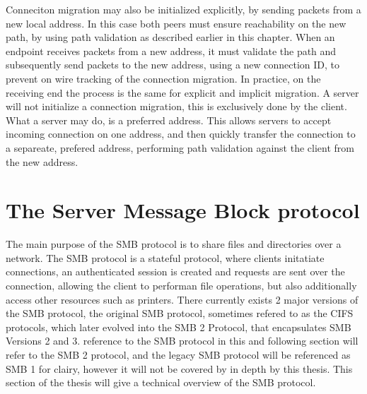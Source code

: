 \documentclass[english, 12pt, a4paper, elec, utf8, a-2b, online]{aaltothesis}
\begin{document}
Conneciton migration may also be initialized explicitly, by sending packets from
a new local address. In this case both peers must ensure reachability on the
new path, by using path validation as described earlier in this chapter. When an endpoint
receives packets from a new address, it must validate the path and subsequently
send packets to the new address, using a new connection ID, to prevent on wire
tracking of the connection migration. In practice, on the receiving end the process
is the same for explicit and implicit migration. A server will not initialize a 
connection migration, this is exclusively done by the client. What a server may
do, is a preferred address. This allows servers to accept incoming connection
on one address, and then quickly transfer the connection to a separeate, prefered
address, performing path validation against the client from the new address\cite{rfc9000}.

\clearpage

\section{The Server Message Block protocol}
\label{sec:smb}

The main purpose of the SMB protocol is to share files and directories over a network.
The SMB protocol is a stateful protocol, where clients initatiate connections,
an authenticated session is created and requests are sent over the connection, allowing
the client to performan file operations, but also additionally access other resources
such as printers. There currently exists 2 major versions of the SMB protocol,
the original SMB protocol, sometimes refered to as the CIFS protocols, which later
evolved into the SMB 2 Protocol, that encapsulates SMB Versions 2 and 3\cite{smb2_tech}. reference
to the SMB protocol in this and following section will refer to the SMB 2 protocol,
and the legacy SMB protocol will be referenced as SMB 1 for clairy, however it will
not be covered by in depth by this thesis. This section of the thesis will give a
technical overview of the SMB protocol.
\end{document}
